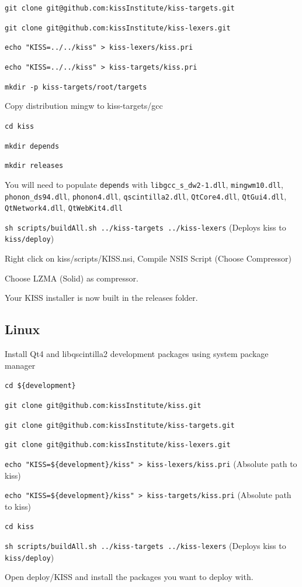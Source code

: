 \documentclass[7pt,letterpaper]{article}
\newcommand{\code}[1]{\texttt{#1}}
\newcounter{counter}
\begin{document}
\begin{list}{Step :~}{}{}
	\item \code{git clone git@github.com:kissInstitute/kiss-targets.git}
	\item \code{git clone git@github.com:kissInstitute/kiss-lexers.git}
	\item \code{echo "KISS=../../kiss" > kiss-lexers/kiss.pri}
	\item \code{echo "KISS=../../kiss" > kiss-targets/kiss.pri}
	\item \code{mkdir -p kiss-targets/root/targets}
	\item Copy distribution mingw to kiss-targets/gcc
	\item \code{cd kiss}
	\item \code{mkdir depends}
	\item \code{mkdir releases}
	\item You will need to populate \code{depends} with \code{libgcc\_s\_dw2-1.dll}, \code{mingwm10.dll},
		\code{phonon\_ds94.dll}, \code{phonon4.dll}, \code{qscintilla2.dll}, \code{QtCore4.dll}, \code{QtGui4.dll},
		\code{QtNetwork4.dll}, \code{QtWebKit4.dll}
	\item \code{sh scripts/buildAll.sh ../kiss-targets ../kiss-lexers} (Deploys kiss to \code{kiss/deploy})
	\item Right click on kiss/scripts/KISS.nsi, Compile NSIS Script (Choose Compressor)
	\item Choose LZMA (Solid) as compressor.
	\item Your KISS installer is now built in the releases folder.
	\end{list}
	
	\subsection{Linux}
	\begin{list}{Step :~}{}{}
	\item Install Qt4 and libqscintilla2 development packages using system package manager
	\item \code{cd \$\{development\}}
	\item \code{git clone git@github.com:kissInstitute/kiss.git}
	\item \code{git clone git@github.com:kissInstitute/kiss-targets.git}
	\item \code{git clone git@github.com:kissInstitute/kiss-lexers.git}
	\item \code{echo "KISS=\$\{development\}/kiss" > kiss-lexers/kiss.pri} (Absolute path to kiss)
	\item \code{echo "KISS=\$\{development\}/kiss" > kiss-targets/kiss.pri} (Absolute path to kiss)
	\item \code{cd kiss}
	\item \code{sh scripts/buildAll.sh ../kiss-targets ../kiss-lexers} (Deploys kiss to \code{kiss/deploy})
	\item Open deploy/KISS and install the packages you want to deploy with.
	\end{list}
	
\end{document}
